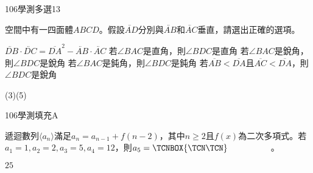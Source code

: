     \begin{QUESTION}
        \begin{ExamInfo}{106}{學測}{多選}{13}
        \end{ExamInfo}
        \begin{ExamAnsRateInfo}{36}{54}{32}{22}
        \end{ExamAnsRateInfo}
        \begin{QBODY}
            空間中有一四面體$ABCD$。假設$\lvec{AD}$分別與$\lvec{AB}$和$\lvec{AC}$垂直，請選出正確的選項。
			\begin{QOPS}
				\QOP $\lvec{DB}\cdot\lvec{DC} ={{\overline{DA}}^{2}}- \lvec{AB}\cdot \lvec{AC}$
				\QOP 若$\angle BAC$是直角，則$\angle BDC$是直角
				\QOP 若$\angle BAC$是銳角，則$\angle BDC$是銳角
				\QOP 若$\angle BAC$是鈍角，則$\angle BDC$是鈍角
				\QOP 若$\overline{AB}<\overline{DA}$且$\overline{AC}<\overline{DA}$，則$\angle BDC$是銳角
			\end{QOPS}
        \end{QBODY}
        \begin{QFROMS}
        \end{QFROMS}
        \begin{QTAGS}\end{QTAGS}
        \begin{QANS}
            (3)(5)
        \end{QANS}
        \begin{QSOLLIST}
        \end{QSOLLIST}
        \begin{QEMPTYSPACE}
        \end{QEMPTYSPACE}
    \end{QUESTION}
    \begin{QUESTION}
        \begin{ExamInfo}{106}{學測}{填充}{A}
        \end{ExamInfo}
        \begin{ExamAnsRateInfo}{54}{82}{60}{20}
        \end{ExamAnsRateInfo}
        \begin{QBODY}
            遞迴數列$\langle {{a}_{n}}\rangle $滿足${{a}_{n}}={{a}_{n-1}}+f(n-2)$，其中$n\ge 2$且$f(x)$為二次多項式。若${{a}_{1}}=1,{{a}_{2}}=2,{{a}_{3}}=5,{{a}_{4}}=12$，則${{a}_{5}}= \TCNBOX{ \TCN\TCN }$　　　　　。
        \end{QBODY}
        \begin{QFROMS}
        \end{QFROMS}
        \begin{QTAGS}\end{QTAGS}
        \begin{QANS}
            $25$
        \end{QANS}
        \begin{QSOLLIST}
        \end{QSOLLIST}
        \begin{QEMPTYSPACE}
        \end{QEMPTYSPACE}
    \end{QUESTION}
